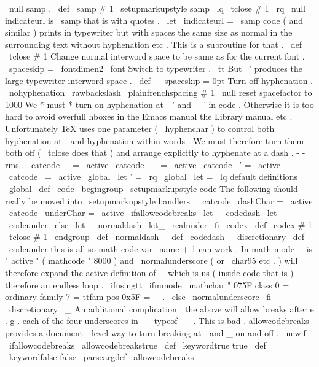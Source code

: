 {{{\
null
}
%
samp
.
\
def
\
samp
#
1
{
{
\
setupmarkupstyle
{
samp
}
\
lq
\
tclose
{
#
1
}
\
rq
\
null
}
}
%
indicateurl
is
\
samp
that
is
with
quotes
.
\
let
\
indicateurl
=
\
samp
%
code
(
and
similar
)
prints
in
typewriter
but
with
spaces
the
same
%
size
as
normal
in
the
surrounding
text
without
hyphenation
etc
.
%
This
is
a
subroutine
for
that
.
\
def
\
tclose
#
1
{
%
{
%
%
Change
normal
interword
space
to
be
same
as
for
the
current
font
.
\
spaceskip
=
\
fontdimen2
\
font
%
%
Switch
to
typewriter
.
\
tt
%
%
But
\
'
produces
the
large
typewriter
interword
space
.
\
def
\
{
{
\
spaceskip
=
0pt
{
}
}
}
%
%
%
Turn
off
hyphenation
.
\
nohyphenation
%
\
rawbackslash
\
plainfrenchspacing
#
1
%
}
%
\
null
%
reset
spacefactor
to
1000
}
%
We
*
must
*
turn
on
hyphenation
at
-
'
and
_
'
in
code
.
%
Otherwise
it
is
too
hard
to
avoid
overfull
hboxes
%
in
the
Emacs
manual
the
Library
manual
etc
.
%
%
Unfortunately
TeX
uses
one
parameter
(
\
hyphenchar
)
to
control
%
both
hyphenation
at
-
and
hyphenation
within
words
.
%
We
must
therefore
turn
them
both
off
(
\
tclose
does
that
)
%
and
arrange
explicitly
to
hyphenate
at
a
dash
.
%
-
-
rms
.
{
\
catcode
\
-
=
\
active
\
catcode
\
_
=
\
active
\
catcode
\
'
=
\
active
\
catcode
\
=
\
active
\
global
\
let
'
=
\
rq
\
global
\
let
=
\
lq
%
default
definitions
%
\
global
\
def
\
code
{
\
begingroup
\
setupmarkupstyle
{
code
}
%
%
The
following
should
really
be
moved
into
\
setupmarkupstyle
handlers
.
\
catcode
\
dashChar
=
\
active
\
catcode
\
underChar
=
\
active
\
ifallowcodebreaks
\
let
-
\
codedash
\
let_
\
codeunder
\
else
\
let
-
\
normaldash
\
let_
\
realunder
\
fi
\
codex
}
}
\
def
\
codex
#
1
{
\
tclose
{
#
1
}
\
endgroup
}
\
def
\
normaldash
{
-
}
\
def
\
codedash
{
-
\
discretionary
{
}
{
}
{
}
}
\
def
\
codeunder
{
%
%
this
is
all
so
math
{
code
{
var_name
}
+
1
}
can
work
.
In
math
mode
_
%
is
"
active
"
(
mathcode
"
8000
)
and
\
normalunderscore
(
or
\
char95
etc
.
)
%
will
therefore
expand
the
active
definition
of
_
which
is
us
%
(
inside
code
that
is
)
therefore
an
endless
loop
.
\
ifusingtt
{
\
ifmmode
\
mathchar
"
075F
%
class
0
=
ordinary
family
7
=
ttfam
pos
0x5F
=
_
.
\
else
\
normalunderscore
\
fi
\
discretionary
{
}
{
}
{
}
}
%
{
\
_
}
%
}
%
An
additional
complication
:
the
above
will
allow
breaks
after
e
.
g
.
%
each
of
the
four
underscores
in
__typeof__
.
This
is
bad
.
%
allowcodebreaks
provides
a
document
-
level
way
to
turn
breaking
at
-
%
and
_
on
and
off
.
%
\
newif
\
ifallowcodebreaks
\
allowcodebreakstrue
\
def
\
keywordtrue
{
true
}
\
def
\
keywordfalse
{
false
}
\
parseargdef
\
allowcodebreaks
}}
